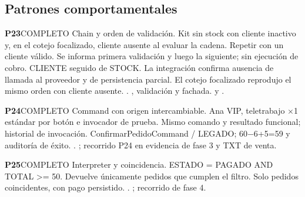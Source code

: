 \subsection*{Patrones comportamentales}
\par\medskip\noindent\begin{minipage}{\linewidth}
\noindent\textbf{\large P23}\quad\textsf{COMPLETO}
 Chain y orden de validación.
 Kit sin stock con cliente inactivo y, en el cotejo focalizado, cliente ausente al evaluar la cadena. Repetir con un cliente válido.
 Se informa primera validación y luego la siguiente; sin ejecución de cobro.
 CLIENTE seguido de STOCK. La integración confirma ausencia de llamada al proveedor y de persistencia parcial. El cotejo focalizado reprodujo el mismo orden con cliente ausente.
 . , validación y fachada.  y .
\end{minipage}\par
\par\medskip\noindent\begin{minipage}{\linewidth}
\noindent\textbf{\large P24}\quad\textsf{COMPLETO}
 Command con origen intercambiable.
 Ana VIP, teletrabajo $\times$1 estándar por botón e invocador de prueba.
 Mismo comando y resultado funcional; historial de invocación.
 ConfirmarPedidoCommand / LEGADO; 60$-$6+5=59 y auditoría de éxito.
 . ; recorrido P24 en evidencia de fase 3 y TXT de venta.
\end{minipage}\par
\par\medskip\noindent\begin{minipage}{\linewidth}
\noindent\textbf{\large P25}\quad\textsf{COMPLETO}
 Interpreter y coincidencia.
 ESTADO = PAGADO AND TOTAL >= 50.
 Devuelve únicamente pedidos que cumplen el filtro.
 Solo pedidos coincidentes, con pago persistido.
 . ; recorrido de fase 4.
\end{minipage}\par

